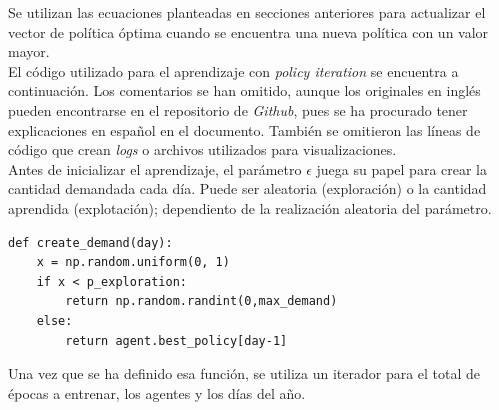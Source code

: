Se utilizan las ecuaciones planteadas en secciones anteriores para actualizar el vector de pol\'itica \'optima cuando se encuentra una nueva pol\'itica con un valor mayor.\\

El código utilizado para el aprendizaje con \textit{policy iteration} se encuentra a continuaci\'on. Los comentarios se han omitido, aunque los originales en ingl\'es pueden encontrarse en el repositorio de \textit{Github}, pues se ha procurado tener explicaciones en espa\~nol en el documento. Tambi\'en se omitieron las l\'ineas de c\'odigo que crean \textit{logs} o archivos utilizados para visualizaciones. \\

Antes de inicializar el aprendizaje, el par\'ametro $\epsilon$ juega su papel para crear la cantidad demandada cada d\'ia. Puede ser aleatoria (exploraci\'on) o la cantidad aprendida (explotaci\'on); dependiento de la realizaci\'on aleatoria del par\'ametro.

\begin{verbatim}
def create_demand(day):
    x = np.random.uniform(0, 1)
    if x < p_exploration:  
        return np.random.randint(0,max_demand) 
    else: 
        return agent.best_policy[day-1]
\end{verbatim}

Una vez que se ha definido esa funci\'on, se utiliza un iterador para el total de \'epocas a entrenar, los agentes y los d\'ias del a\~no.

